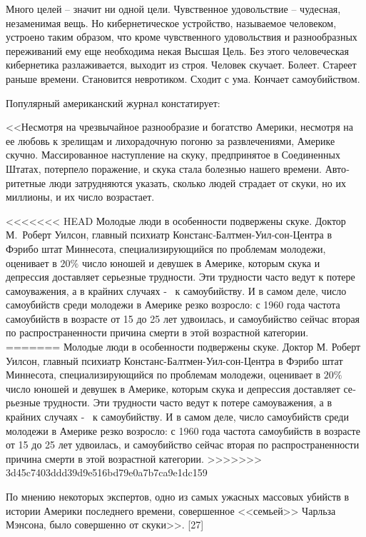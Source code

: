 \documentclass{book}
\begin{document}
{Много целей -- значит ни одной цели. Чувственное удовольст­вие -- чудесная, незаменимая вещь. Но кибернетическое устрой­ство, называемое человеком, устроено таким образом, что кро­ме чувственного удовольствия и разнообразных переживаний ему еще необходима некая Высшая Цель. Без этого человече­ская кибернетика разлаживается, выходит из строя. Человек ску­чает. Болеет. Стареет раньше времени. Становится невротиком. Сходит с ума. Кончает самоубийством.

Популярный американский журнал констатирует:

<<Несмотря на чрезвычайное разнообразие и богатство Аме­рики, несмотря на ее любовь к зрелищам и лихорадочную пого­ню за развлечениями, Америке скучно. Массированное насту­пление на скуку, предпринятое в Соединенных Штатах, потер­пело поражение, и скука стала болезнью нашего времени. Авто­ритетные люди затрудняются указать, сколько людей страдает от скуки, но их миллионы, и их число возрастает.

<<<<<<< HEAD
Молодые люди в особенности подвержены скуке. Доктор М.~Роберт Уилсон, главный психиатр Констанс‑Балтмен‑Уил‑сон‑Центра в Фэрибо штат Миннесота, специализирующийся по проблемам молодежи, оценивает в $20\%$ число юношей и де­вушек в Америке, которым скука и депрессия доставляет се­рьезные трудности. Эти трудности часто ведут к потере самоува­жения, а в крайних случаях ‑  к самоубийству. И в самом деле, число самоубийств среди молодежи в Америке резко возрос­ло: с 1960 года частота самоубийств в возрасте от 15 до 25 лет удвоилась, и самоубийство сейчас вторая по распространенно­сти причина смерти в этой возрастной категории.
=======
Молодые люди в особенности подвержены скуке. Доктор М. Роберт Уилсон, главный психиатр Констанс-Балтмен-Уил-сон-Центра в Фэрибо штат Миннесота, специализирующийся по проблемам молодежи, оценивает в $20\%$ число юношей и де­вушек в Америке, которым скука и депрессия доставляет се­рьезные трудности. Эти трудности часто ведут к потере самоува­жения, а в крайних случаях -  к самоубийству. И в самом деле, число самоубийств среди молодежи в Америке резко возрос­ло: с 1960 года частота самоубийств в возрасте от 15 до 25 лет удвоилась, и самоубийство сейчас вторая по распространенно­сти причина смерти в этой возрастной категории.
>>>>>>> 3d45c7403ddd39d9e516bd79e0a7b7ca9e1dc159

По мнению некоторых экспертов, одно из самых ужасных массовых убийств в истории Америки последнего времени, совершенное <<семьей>> Чарльза Мэнсона, было совершенно от скуки>>. [27]

}
\end{document}
